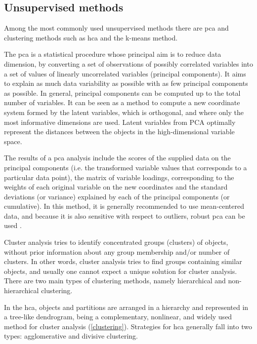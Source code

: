 
\subsection{Unsupervised methods} \label{unsupervised}

Among the most commonly used unsupervised methods there are \acrfull{pca} and clustering methods such as \acrfull{hca} and the k-means method.

The \gls{pca} is a statistical procedure whose principal aim is to reduce data dimension, by converting a set of observations of possibly correlated variables into a set of values of linearly uncorrelated variables (principal components). It aims to explain as much data variability as possible with as few principal components as possible. In general, principal components can be computed up to the total number of variables. It can be seen as a method to compute a new coordinate system formed by the latent variables, which is orthogonal, and where only the most informative dimensions are used. Latent variables from PCA optimally represent the distances between the objects in the high-dimensional variable space.

The results of a \gls{pca} analysis include the scores of the supplied data on the principal components (i.e. the transformed variable values that corresponds to a particular data point), the matrix of variable loadings, corresponding to the weights of each original variable on the new coordinates and the standard deviations (or variance) explained by each of the principal components (or cumulative). In this method, it is generally recommended to use mean-centered data, and because it is also sensitive with respect to outliers, robust \gls{pca} can be used \citep{varmuza2009introduction}.

Cluster analysis tries to identify concentrated groups (clusters) of objects, without prior information about any group membership and/or number of clusters. In other words, cluster analysis tries to find groups containing similar objects, and usually one cannot expect a unique solution for cluster analysis. There are two main types of clustering methods, namely hierarchical and non-hierarchical clustering.

In the \acrfull{hca}, objects and partitions are arranged in a hierarchy and represented in a tree-like dendrogram, being a complementary, nonlinear, and widely used method for cluster analysis (\autoref{clustering}). Strategies for \gls{hca} generally fall into two types: agglomerative and divisive clustering. 

